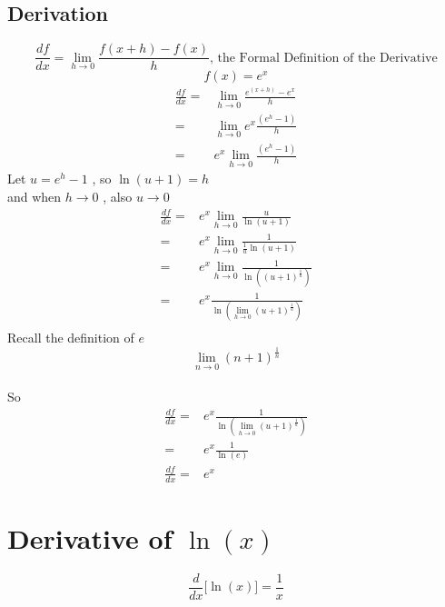 \documentclass[11pt]{book}
\begin{document}
\subsection{Derivation}
\[\frac{df}{dx} = \lim_{h\to0}\frac{f(x+h) -f(x)}{h}  \text{, the Formal Definition of the Derivative} \]
\[ f(x) = e^x \]
\begin{align*}
\frac{df}{dx} =& \lim_{h\to0}\frac{e^{(x+h)} - e^x}{h} \\
=& \lim_{h\to0} e^x\frac{(e^h - 1)}{h} \\
=& e^x \lim_{h\to0} \frac{(e^h - 1)}{h}
\end{align*}
Let \( u = e^h -1 \) , so \(\ln{(u+1)} = h \) \\
and when \( h\to 0 \) , also  \(u \to 0\)
\begin{align*}
\frac{df}{dx} =& e^x \lim_{h\to0} \frac{u}{\ln{(u+1)}} \\
=& e^x \lim_{h\to0} \frac{1}{\frac{1}{u}\ln{(u+1)}} \\
=& e^x \lim_{h\to0} \frac{1}{\ln{\left((u+1)^{\frac{1}{u}}\right)}} \\
=& e^x  \frac{1}{\ln{\left(\lim_{h\to0}(u+1)^{\frac{1}{u}}\right)}} \\
\end{align*}
Recall the definition of \(e\)
\[\lim_{n\to0}(n+1)^{\frac{1}{n}}\]\\
So
\begin{align*}
\frac{df}{dx} =& e^x  \frac{1}{\ln{\left(\lim_{h\to0}(u+1)^{\frac{1}{u}}\right)}} \\
 =& e^x  \frac{1}{\ln{(e)}} \\
 \frac{df}{dx} =& e^x
\end{align*}

\section{Derivative of $\ln(x)$}
\[ \frac{d}{dx}\bigg[\ln(x) \bigg] = \frac{1}{x} \]
\end{document}
